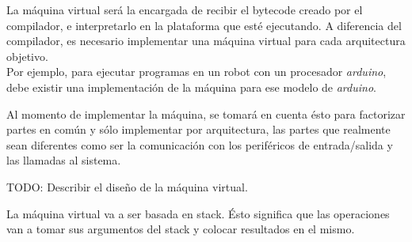   
  
  La máquina virtual será la encargada de recibir el bytecode creado por
el compilador, e interpretarlo en la plataforma que esté ejecutando.
  A diferencia del compilador, es necesario implementar una máquina virtual
para cada arquitectura objetivo.\\

  Por ejemplo, para ejecutar programas en un robot
  con un procesador \emph{arduino}, debe
  existir una implementación de la máquina para ese modelo
  de \emph{arduino}.

  Al momento de implementar la máquina, se tomará en cuenta ésto para
  factorizar partes en común y sólo implementar por arquitectura, las
  partes que realmente sean diferentes como ser la comunicación con
  los periféricos de entrada/salida y las llamadas al sistema.


TODO: Describir el diseño de la máquina virtual.

  La máquina virtual va a ser basada en stack. Ésto significa
que las operaciones van a tomar sus argumentos del stack y
colocar resultados en el mismo.

